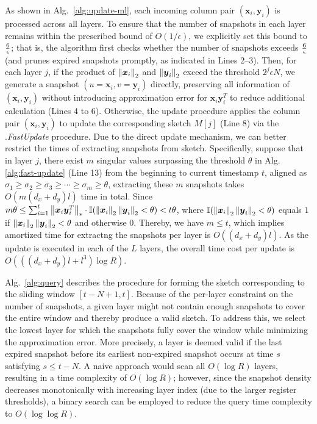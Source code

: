  As shown in Alg.\ \ref{alg:update-ml}, each incoming column pair \( (\boldsymbol{x}_i,\boldsymbol{y}_i) \) is processed across all layers. To ensure that the number of snapshots in each layer remains within the prescribed bound of \( O(1/\epsilon) \), we explicitly set this bound to \( \frac{6}{\epsilon} \); that is, the algorithm first checks whether the number of snapshots exceeds \( \frac{6}{\epsilon} \) (and prunes expired snapshots promptly, as indicated in Lines 2--3). Then, for each layer \( j \), if the product of $\left\|\boldsymbol{x}_i\right\|_2$ and $\left\|\boldsymbol{y}_i\right\|_2$ exceed the threshold $2^j\epsilon N$, we  generate a snapshot $(u=\boldsymbol{x}_i,v=\boldsymbol{y}_i)$ directly, preserving all information of $(\boldsymbol{x}_i,\boldsymbol{y}_i)$ without introducing approximation error for $\boldsymbol{x}_i\boldsymbol{y}_i^T$ to reduce additional calculation (Lines 4 to 6). Otherwise, the update procedure applies the column pair \( (\boldsymbol{x}_i,\boldsymbol{y}_i) \) to update the corresponding \oursolution sketch \( M[j] \) (Line 8) via the \oursolution.\textit{FastUpdate} procedure.  Due to the direct update mechanism, we can better restrict the times of extracting snapshots from sketch. Specifically, suppose that in layer $j$, there exist $m$ singular values surpassing the threshold $\theta$ in Alg.\ref{alg:fast-update} (Line 13) from the beginning to current timestamp $t$, aligned as $\sigma_1\geq \sigma_2 \geq \sigma_3 \geq \cdots \geq \sigma_m \geq \theta$, extracting these $m$ snapshots takes $O(m(d_x+d_y)l)$ time in total. Since $m\theta \leq \sum_{i=1}^t \left\|\boldsymbol{x}_i\boldsymbol{y}_i^T\right\|_{*} \cdot \mathbb{I}(\left\|\boldsymbol{x}_i\right\|_2\left\|\boldsymbol{y}_i\right\|_2 <\theta) < t\theta$, where $\mathbb{I}(\left\|\boldsymbol{x}_i\right\|_2\left\|\boldsymbol{y}_i\right\|_2 <\theta)$ equals $1$ if $\left\|\boldsymbol{x}_i\right\|_2\left\|\boldsymbol{y}_i\right\|_2 <\theta$ and otherwise $0$. Thereby, we have $m \leq t$, which implies amortized time for extractng the snapshots per layer is $O((d_x+d_y)l)$. As the update is executed in each of the \( L \) layers, the overall time cost per update is \( O(((d_x+d_y)l + l^3)\log R) \).

 Alg.\ \ref{alg:query} describes the procedure for forming the sketch corresponding to the sliding window \( [t-N+1,t] \). Because of the per-layer constraint on the number of snapshots, a given layer might not contain enough snapshots to cover the entire window and thereby produce a valid sketch. To address this, we select the lowest layer for which the snapshots fully cover the window while minimizing the approximation error. More precisely, a layer is deemed valid if the last expired snapshot before its earliest non-expired snapshot occurs at time \( s \) satisfying \( s \le t-N \). A naive approach would scan all \( O(\log R) \) layers, resulting in a time complexity of \( O(\log R) \); however, since the snapshot density decreases monotonically with increasing layer index (due to the larger register thresholds), a binary search can be employed to reduce the query time complexity to \( O(\log \log R) \). 

